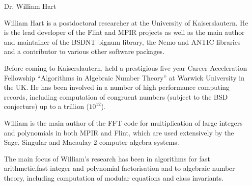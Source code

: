 \begin{picv}{Dr. William Hart}

William Hart is a postdoctoral researcher at the University of
Kaiserslautern. He is the lead developer of the Flint and MPIR projects
as well as the main author and maintainer of the BSDNT bignum library, the
Nemo and ANTIC libraries and a contributor to various other software packages.

Before coming to Kaiserslautern, held a prestigious five year Career
Acceleration Fellowship ``Algorithms in Algebraic Number Theory'' at Warwick 
University in the UK. He has been involved in a number of high performance
computing records, including computation of congruent numbers (subject to the 
BSD conjecture) up to a trillion ($10^{12}$).

William is the main author of the FFT code for multiplication of large integers
and polynomials in both MPIR and Flint, which are used extensively by the Sage,
Singular and Macaulay 2 computer algebra systems.

The main focus of William's research has been in algorithms for fast arithmetic,fast integer and polynomial factorisation and to algebraic number theory,
including computation of modular equations and class invariants.
\end{picv}
